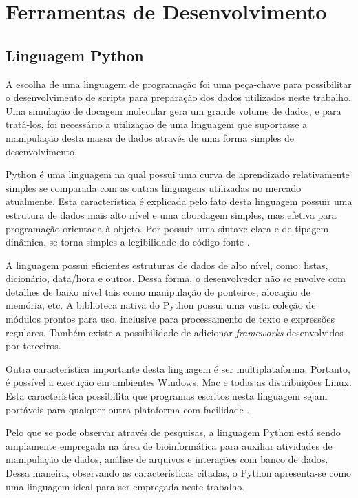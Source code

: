 \chapter{Ferramentas de Desenvolvimento}

\section{Linguagem Python}
A escolha de uma linguagem de programação foi uma peça-chave para possibilitar o desenvolvimento de scripts para preparação dos dados utilizados neste trabalho. Uma simulação de docagem molecular gera um grande volume de dados, e para tratá-los, foi necessário a utilização de uma linguagem que suportasse a manipulação desta massa de dados através de uma forma simples de desenvolvimento.

Python é uma linguagem na qual possui uma curva de aprendizado relativamente simples se comparada com as outras linguagens utilizadas no mercado atualmente. Esta característica é explicada pelo fato desta linguagem possuir uma estrutura de dados mais alto nível e uma abordagem simples, mas efetiva para programação orientada à objeto. Por possuir uma sintaxe clara e de tipagem dinâmica, se torna simples a legibilidade do código fonte \cite{pyt00}. 

A linguagem possui eficientes estruturas de dados de alto nível, como: listas, dicionário, data/hora e outros. Dessa forma, o desenvolvedor não se envolve com detalhes de baixo nível tais como manipulação de ponteiros, alocação de memória, etc. A biblioteca nativa do Python possui uma vasta coleção de módulos prontos para uso, inclusive para processamento de texto e expressões regulares. Também existe a possibilidade de adicionar \emph{frameworks} desenvolvidos por terceiros.

Outra característica importante desta linguagem é ser multiplataforma. Portanto, é possível a execução em ambientes Windows, Mac e todas as distribuições Linux. Esta característica possibilita que programas escritos nesta linguagem sejam portáveis para qualquer outra plataforma com facilidade \cite{pyt01}.

Pelo que se pode observar através de pesquisas, a linguagem Python está sendo amplamente empregada na área de bioinformática para auxiliar atividades de manipulação de dados, análise de arquivos e interações com banco de dados. Dessa maneira, observando as características citadas, o Python apresenta-se como uma linguagem ideal para ser empregada neste trabalho.

